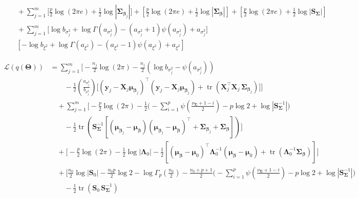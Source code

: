 \begin{appendix}
\begin{itemize}
\begin{equation}
\begin{split}
&\quad + \sum_{j=1}^{m}\Bigg[
\tfrac{p}{2}\log(2\pi e)+\tfrac{1}{2}\log|\bm{\Sigma}_{\bm{\beta}_j}|
\Bigg] + \left[\tfrac{p}{2}\log(2\pi e)+\tfrac{1}{2}\log|\bm{\Sigma}_{\bm{\beta}}|\right] +\left[\tfrac{p}{2}\log(2\pi e)+\tfrac{1}{2}\log|\bm{S}_{\bm{\Sigma}}|\right]\\
&\quad +\sum_{j=1}^{m}\Bigg[\log b_{\sigma_j^2}+\log\Gamma(a_{\sigma_j^2})-(a_{\sigma_j^2}+1)\psi(a_{\sigma_j^2})+a_{\sigma_j^2}\Bigg] \\
&\quad \left[-\log b_{\xi^2}+\log\Gamma(a_{\xi^2})-(a_{\xi^2}-1)\psi(a_{\xi^2})+a_{\xi^2}\right]
\end{split}
\end{equation}

\begin{equation}
\begin{split}
\mathcal{L}\left(q(\bm{\Theta})\right)
&= \sum_{j=1}^{m}\Bigg[
-\tfrac{n_j}{2}\log(2\pi)
-\tfrac{n_j}{2}\left(\log b_{\sigma_j^2}-\psi(a_{\sigma_j^2})\right) \\
&\qquad
-\tfrac{1}{2}\left(\tfrac{a_{\sigma_j^2}}{b_{\sigma_j^2}}\right)
\Big[
(\bm{y}_j-\mathbf{X}_j\bm{\mu}_{\bm{\beta}_j})^\top(\bm{y}_j-\mathbf{X}_j\bm{\mu}_{\bm{\beta}_j})
+\operatorname{tr}\!\left(\mathbf{X}_j^\top\mathbf{X}_j\,\bm{\Sigma}_{\bm{\beta}_j}\right)
\Big]
\Bigg] \\
&\quad + \sum_{j=1}^{m}\Bigg[
-\tfrac{p}{2}\log(2\pi)
-\tfrac{1}{2}\Bigg(
-\sum_{i=1}^{p}\psi\!\left(\tfrac{\nu_{\bm{\Sigma}}+1-i}{2}\right)
-p\log 2 + \log|\bm{S}_{\bm{\Sigma}}^{-1}|
\Bigg) \\
&\qquad
-\tfrac{1}{2}\operatorname{tr}\!\!\left(\bm{S}_{\bm{\Sigma}}^{-1}\!\!\left[
(\bm{\mu}_{\bm{\beta}_j}-\bm{\mu}_{\bm{\beta}})
(\bm{\mu}_{\bm{\beta}_j}-\bm{\mu}_{\bm{\beta}})^\top
+\bm{\Sigma}_{\bm{\beta}_j}+\bm{\Sigma}_{\bm{\beta}}
\right]\right)
\Bigg] \\
&\quad + \Bigg[
-\tfrac{p}{2}\log(2\pi)-\tfrac{1}{2}\log|\bm{\Lambda}_0|
-\tfrac{1}{2}\left[
(\bm{\mu}_{\bm{\beta}}-\bm{\mu}_0)^\top\bm{\Lambda}_0^{-1}(\bm{\mu}_{\bm{\beta}}-\bm{\mu}_0)
+\operatorname{tr}\!\left(\bm{\Lambda}_0^{-1}\bm{\Sigma}_{\bm{\beta}}\right)
\right]
\Bigg] \\
&\quad + \Bigg[
\tfrac{n_0}{2}\log|\bm{S}_0|-\tfrac{n_0 p}{2}\log 2-\log\Gamma_p\left(\tfrac{n_0}{2}\right)
-\tfrac{n_0+p+1}{2}\Bigg(
-\sum_{i=1}^{p}\psi\left(\tfrac{\nu_{\bm{\Sigma}}+1-i}{2}\right)-p\log 2+\log|\bm{S}_{\bm{\Sigma}}^{-1}|
\Bigg) \\
&\qquad
-\tfrac{1}{2}\operatorname{tr}\!\!\left(\bm{S}_0\,\bm{S}_{\bm{\Sigma}}^{-1}\right)

\end{split}
\end{equation}
\end{itemize}
\end{appendix}
